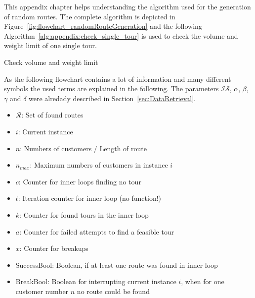 This appendix chapter helps understanding the algorithm used for the generation of random routes. The complete algorithm
is depicted in Figure~\ref{fig:flowchart_randomRouteGeneration} and the following Algorithm~\ref{alg:appendix:check_single_tour}
is used to check the volume and weight limit of one single tour.
\begin{algorithm}[ht]
    \caption{Check volume and weight limit}
    \label{alg:appendix:check_single_tour}
    \begin{algorithmic}[1]\onehalfspacing
         
         
        \Else
        \EndIf
        \EndProcedure
    \end{algorithmic}
\end{algorithm}

As the following flowchart contains a lot of information and many different symbols the used terms are explained in
the following. The parameters $\mathcal{IS}$, $\alpha$, $\beta$, $\gamma$ and $\delta$ were alredady described in
Section~\ref{sec:DataRetrieval}.

\begin{itemize}\singlespacing
    \item $\mathcal{R}$: Set of found routes
    \item $i$: Current instance
    \item $n$: Numbers of customers / Length of route
    \item $n_{max}$: Maximum numbers of customers in instance $i$
    \item $c$: Counter for inner loops finding no tour
    \item $t$: Iteration counter for inner loop (no function!)
    \item $k$: Counter for found tours in the inner loop
    \item $a$: Counter for failed attempts to find a feasible tour
    \item $x$: Counter for breakups
    \item SuccessBool: Boolean, if at least one route was found in inner loop
    \item BreakBool: Boolean for interrupting current instance $i$, when for one customer number $n$ no route could be found
\end{itemize}



